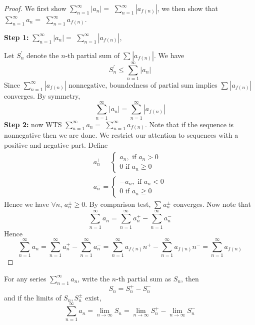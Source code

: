 \begin{proof}
    We first show 
    $\sum\limits_{n = 1}^{\infty} |a_n| = $
    $\sum\limits_{n = 1}^{\infty} |a_{f(n)}|$,
    we then show that 
    $\sum\limits_{n = 1}^{\infty} a_n = $
    $\sum\limits_{n = 1}^{\infty} a_{f(n)}$.
    \medskip

    \textbf{Step 1:}
    $\sum\limits_{n = 1}^{\infty} |a_n| = $
    $\sum\limits_{n = 1}^{\infty} |a_{f(n)}|$,

    Let $S_n^{\prime}$ denote the $n$-th partial sum of
    $\sum\limits_{}^{} |a_{f(n)}|$.
    We have 
    \[
        S_n^{\prime} \leq \sum\limits_{n = 1}^{\infty} |a_n|
    \]
    Since $\sum\limits_{n=1}^{\infty} |a_{f(n)}|$ nonnegative,
    boundedness of partial sum implies $\sum\limits_{}^{} |a_{f(n)}|$
    converges. By symmetry,
    \[
    \sum\limits_{n=1}^{\infty} |a_{n} |=
    \sum\limits_{n=1}^{\infty} |a_{f(n)} |
    \]
    \textbf{Step 2:} now WTS 
    $\sum\limits_{n = 1}^{\infty} a_n = $
    $\sum\limits_{n = 1}^{\infty} a_{f(n)}$.
    Note that if the sequence is nonnegative then we are done. 
    We restrict our attention to sequences with a positive and negative part.
    Define 
    \begin{align*}
        a_n^{+} = \begin{cases}
            a_n, \text{ if } a_n > 0 \\
            0 \text{ if } a_n \geq 0
        \end{cases} \\
        a_n^{-} = \begin{cases}
            -a_n, \text{ if } a_n < 0 \\
            0 \text{ if } a_n \geq 0
        \end{cases}
    \end{align*}
    Hence we have $\forall n$, 
    $a_n^{\pm} \geq 0$.
    By comparison test, $\sum\limits_{}^{} a_n^{\pm}$ converges.
    Now note that 
    \[
        \sum\limits_{n = 1}^{\infty} a_n 
        = 
        \sum\limits_{n = 1}^{\infty} a_n^{+}  -
        \sum\limits_{n = 1}^{\infty} a_n^{-} 
    \]
    Hence 
    \[
        \sum\limits_{n = 1}^{\infty} a_n 
        = 
        \sum\limits_{n = 1}^{\infty} a_n^{+}  -
        \sum\limits_{n = 1}^{\infty} a_n^{-} 
        =
        \sum\limits_{n = 1}^{\infty} a_{f(n)}n^{+}  -
        \sum\limits_{n = 1}^{\infty} a_{f(n)}n^{-} 
    = \sum\limits_{n=1}^{\infty} a_{f(n)}
    \]
\end{proof}

\begin{remark}
    For any series $\sum\limits_{n=1}^{\infty} a_n$,
    write the $n$-th partial sum as $S_n$, then 
    \[
        S_n = S_n^{+} - S_n^{-}
    \]
    and if the limits of $S_n, S_n^{\pm}$ exist,
    \[
    \sum\limits_{n=1}^{\infty} a_n = 
    \lim_{n \to \infty}S_n = 
    \lim_{n \to \infty}S_n^{+} - 
    \lim_{n \to \infty}S_n^{-} 
    \]
\end{remark}


